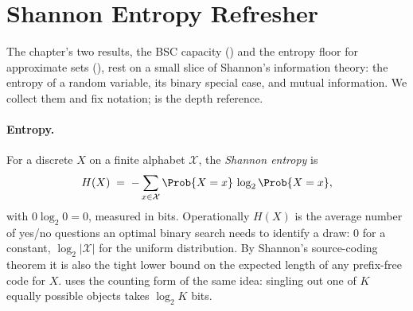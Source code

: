 %

\section{Shannon Entropy Refresher}
\label{sec:entropy-refresher}

The chapter's two results, the BSC capacity () and the
entropy floor for approximate sets (), rest on a small
slice of Shannon's information theory: the entropy of a random variable, its
binary special case, and mutual information. We collect them and fix notation;
\textcite{cover-thomas} is the depth reference.

\paragraph{Entropy.}
For a discrete $X$ on a finite alphabet $\mathcal{X}$, the \emph{Shannon
entropy} is
\begin{equation}
\label{eq:entropy}
  H(X) \;=\; -\sum_{x \in \mathcal{X}} \Prob{X = x}\,\log_2 \Prob{X = x},
\end{equation}
with $0 \log_2 0 = 0$, measured in bits. Operationally $H(X)$ is the average
number of yes/no questions an optimal binary search needs to identify a draw:
$0$ for a constant, $\log_2|\mathcal{X}|$ for the uniform distribution. By
Shannon's source-coding theorem it is also the tight lower bound on the
expected length of any prefix-free code for $X$. 
uses the counting form of the same idea: singling out one of $K$ equally
possible objects takes $\log_2 K$ bits.

